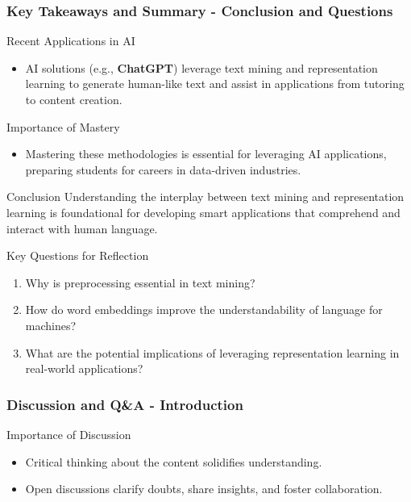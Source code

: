 \documentclass[aspectratio=169]{beamer}
\begin{document}
\begin{frame}[fragile]
    \frametitle{Key Takeaways and Summary - Conclusion and Questions}

    \begin{block}{Recent Applications in AI}
        \begin{itemize}
            \item AI solutions (e.g., \textbf{ChatGPT}) leverage text mining and representation learning to generate human-like text and assist in applications from tutoring to content creation.
        \end{itemize}
    \end{block}

    \begin{block}{Importance of Mastery}
        \begin{itemize}
            \item Mastering these methodologies is essential for leveraging AI applications, preparing students for careers in data-driven industries.
        \end{itemize}
    \end{block}

    \begin{block}{Conclusion}
        Understanding the interplay between text mining and representation learning is foundational for developing smart applications that comprehend and interact with human language.
    \end{block}

    \begin{block}{Key Questions for Reflection}
        \begin{enumerate}
            \item Why is preprocessing essential in text mining?
            \item How do word embeddings improve the understandability of language for machines?
            \item What are the potential implications of leveraging representation learning in real-world applications?
        \end{enumerate}
    \end{block}

\end{frame}

\begin{frame}[fragile]
  \frametitle{Discussion and Q\&A - Introduction}
  \begin{block}{Importance of Discussion}
    \begin{itemize}
      \item Critical thinking about the content solidifies understanding.
      \item Open discussions clarify doubts, share insights, and foster collaboration.
    \end{itemize}
  \end{block}
\end{frame}
\end{document}

